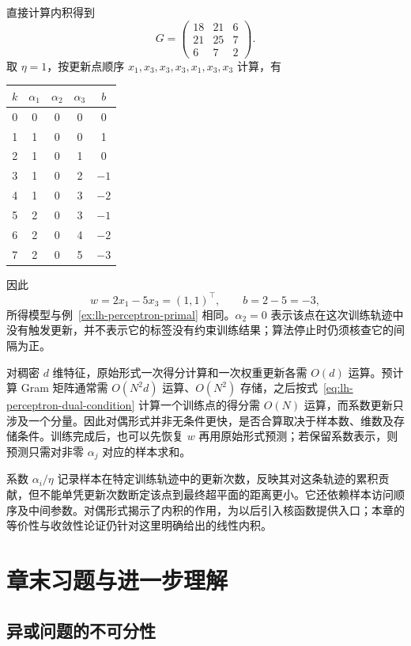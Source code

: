 \begin{solve}
直接计算内积得到
\[
G=
\begin{pmatrix}
18&21&6\\
21&25&7\\
6&7&2
\end{pmatrix}.
\]
取 $\eta=1$，按更新点顺序 $x_1,x_3,x_3,x_3,x_1,x_3,x_3$ 计算，有
\begin{center}
\begin{tabular}{ccccc}
\toprule
$k$ & $\alpha_1$ & $\alpha_2$ & $\alpha_3$ & $b$ \\
\midrule
0 & 0 & 0 & 0 & 0 \\
1 & 1 & 0 & 0 & 1 \\
2 & 1 & 0 & 1 & 0 \\
3 & 1 & 0 & 2 & $-1$ \\
4 & 1 & 0 & 3 & $-2$ \\
5 & 2 & 0 & 3 & $-1$ \\
6 & 2 & 0 & 4 & $-2$ \\
7 & 2 & 0 & 5 & $-3$ \\
\bottomrule
\end{tabular}
\end{center}
因此
\[
w=2x_1-5x_3=(1,1)^\top,
\qquad
b=2-5=-3,
\]
所得模型与例~\ref{ex:lh-perceptron-primal} 相同。$\alpha_2=0$ 表示该点在这次训练轨迹中没有触发更新，并不表示它的标签没有约束训练结果；算法停止时仍须核查它的间隔为正。
\end{solve}

对稠密 $d$ 维特征，原始形式一次得分计算和一次权重更新各需 $O(d)$ 运算。预计算 Gram 矩阵通常需 $O(N^2d)$ 运算、$O(N^2)$ 存储，之后按式~\eqref{eq:lh-perceptron-dual-condition} 计算一个训练点的得分需 $O(N)$ 运算，而系数更新只涉及一个分量。因此对偶形式并非无条件更快，是否合算取决于样本数、维数及存储条件。训练完成后，也可以先恢复 $w$ 再用原始形式预测；若保留系数表示，则预测只需对非零 $\alpha_j$ 对应的样本求和。

系数 $\alpha_i/\eta$ 记录样本在特定训练轨迹中的更新次数，反映其对这条轨迹的累积贡献，但不能单凭更新次数断定该点到最终超平面的距离更小。它还依赖样本访问顺序及中间参数。对偶形式揭示了内积的作用，为以后引入核函数提供入口；本章的等价性与收敛性论证仍针对这里明确给出的线性内积。

\section{章末习题与进一步理解}
\label{sec:lh-perceptron-exercises}

\subsection{异或问题的不可分性}
\label{subsec:lh-perceptron-xor}

